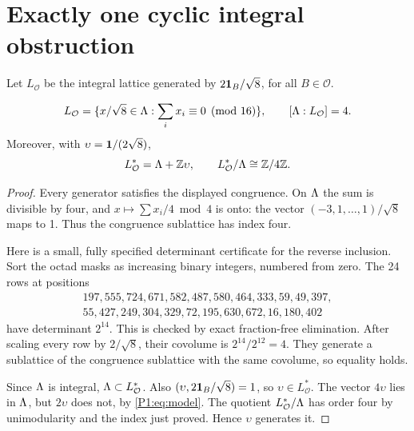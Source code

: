 \section{Exactly one cyclic integral obstruction}
Let $L_{\mathcal O}$ be the integral lattice generated by $2\mathbf1_B/\sqrt8$, for all $B\in\mathcal O$.
\begin{lemma}\label{P1:lem:indexfour}
\[
L_{\mathcal O}=\{x/\sqrt8\in\Lambda:\sum_i x_i\equiv0\pmod{16}\},\qquad
[\Lambda:L_{\mathcal O}]=4.
\]
Moreover, with $\upsilon=\mathbf1/(2\sqrt8)$,
\[
L_{\mathcal O}^*=\Lambda+\mathbb Z\upsilon,\qquad
L_{\mathcal O}^*/\Lambda\cong\mathbb Z/4\mathbb Z.
\]
\end{lemma}
\begin{proof}
Every generator satisfies the displayed congruence. On $\Lambda$ the sum is divisible by four, and $x\mapsto\sum x_i/4\bmod4$ is onto: the vector $(-3,1,\ldots,1)/\sqrt8$ maps to 1. Thus the congruence sublattice has index four.

Here is a small, fully specified determinant certificate for the reverse inclusion. Sort the octad masks as increasing binary integers, numbered from zero. The 24 rows at positions
\[
\begin{gathered}
197,555,724,671,582,487,580,464,333,59,49,397,\\
55,427,249,304,329,72,195,630,672,16,180,402
\end{gathered}
\]
have determinant $2^{14}$. This is checked by exact fraction-free elimination. After scaling every row by $2/\sqrt8$, their covolume is $2^{14}/2^{12}=4$. They generate a sublattice of the congruence sublattice with the same covolume, so equality holds.

Since $\Lambda$ is integral, $\Lambda\subset L_{\mathcal O}^*$. Also $(\upsilon,2\mathbf1_B/\sqrt8)=1$, so $\upsilon\in L_{\mathcal O}^*$. The vector $4\upsilon$ lies in $\Lambda$, but $2\upsilon$ does not, by \eqref{P1:eq:model}. The quotient $L_{\mathcal O}^*/\Lambda$ has order four by unimodularity and the index just proved. Hence $\upsilon$ generates it.
\end{proof}

